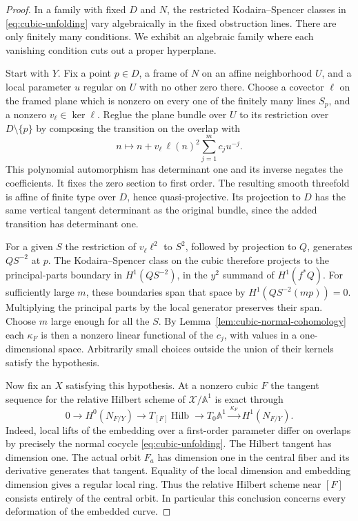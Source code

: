 \begin{proof}
In a family with fixed $D$ and $N$, the restricted
Kodaira--Spencer classes in \eqref{eq:cubic-unfolding} vary
algebraically in the fixed obstruction lines. There are only
finitely many conditions. We exhibit an algebraic family where
each vanishing condition cuts out a proper hyperplane.

Start with $Y$. Fix a point $p\in D$, a frame of $N$ on an affine
neighborhood $U$, and a local parameter $u$ regular on $U$ with
no other zero there. Choose a covector $\ell$ on the framed plane
which is nonzero on every one of the finitely many lines $S_p$,
and a nonzero $v_\ell\in\ker\ell$. Reglue the plane bundle over
$U$ to its restriction over $D\setminus\{p\}$ by composing the
transition on the overlap with
\begin{equation}\label{eq:normal-quadratic-shear}
        n\longmapsto n+v_\ell\,\ell(n)^2
                         \sum_{j=1}^m c_j u^{-j}.
\end{equation}
This polynomial automorphism has determinant one and its inverse
negates the coefficients. It fixes the zero section to first order.
The resulting smooth threefold is affine of finite type over $D$,
hence quasi-projective. Its projection to $D$ has the same vertical
tangent determinant as the original bundle, since the added
transition has determinant one.

For a given $S$ the restriction of $v_\ell\ell^2$ to $S^2$,
followed by projection to $Q$, generates $QS^{-2}$ at $p$.
The Kodaira--Spencer class on the cubic therefore projects to the
principal-parts boundary in $H^1(QS^{-2})$, in the $y^2$ summand of
$H^1(f^*Q)$. For sufficiently large $m$, these boundaries span
that space by $H^1(QS^{-2}(mp))=0$. Multiplying the principal
parts by the local generator preserves their span. Choose $m$
large enough for all the $S$. By Lemma~\ref{lem:cubic-normal-cohomology}
each $\kappa_F$ is then a nonzero linear functional of the $c_j$,
with values in a one-dimensional space. Arbitrarily small choices
outside the union of their kernels satisfy the hypothesis.

Now fix an $X$ satisfying this hypothesis. At a nonzero cubic $F$
the tangent sequence for the relative Hilbert scheme of
$\mathcal X/\mathbb A^1$ is exact through
\[
 0\longrightarrow H^0(N_{F/Y})\longrightarrow T_{[F]}\operatorname{Hilb}
   \longrightarrow T_0\mathbb A^1
   \xrightarrow{\ \kappa_F\ }H^1(N_{F/Y}).
\]
Indeed, local lifts of the embedding over a first-order parameter
differ on overlaps by precisely the normal cocycle
\eqref{eq:cubic-unfolding}. The Hilbert tangent has dimension one.
The actual orbit $F_a$ has dimension one in the central fiber
and its derivative generates that tangent. Equality of the local
dimension and embedding dimension gives a regular local ring.
Thus the relative Hilbert scheme near $[F]$ consists entirely of
the central orbit. In particular this conclusion concerns every
deformation of the embedded curve.


\end{proof}
